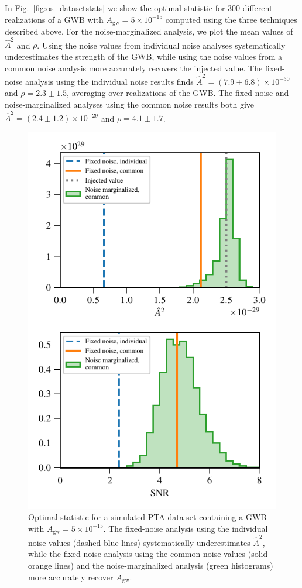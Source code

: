 \documentclass[twocolumn,aps,prd,superscriptaddress]{revtex4-1}
\newcommand{\Agw}{\ensuremath{A_\mathrm{gw}}}
\begin{document}
In Fig.~\ref{fig:os_datasetstats} we show the optimal statistic 
for 300 different realizations of a GWB with $\Agw = 5\times10^{-15}$ 
computed using the three techniques described above. 
For the noise-marginalized analysis, we plot 
the mean values of $\hat{A}^2$ and $\rho$. 
Using the noise values from individual noise analyses 
systematically underestimates the strength of the GWB, 
while using the noise values from a common noise analysis 
more accurately recovers the injected value. 
The fixed-noise analysis using the individual noise results finds 
$\hat{A}^2 = (7.9 \pm 6.8) \times10^{-30}$ and $\rho = 2.3 \pm 1.5$, 
averaging over realizations of the GWB. 
The fixed-noise and noise-marginalized analyses 
using the common noise results both give 
$\hat{A}^2 = (2.4\pm1.2)\times10^{-29}$ and $\rho = 4.1 \pm 1.7$.

\begin{figure}[tb]
	\includegraphics[width=0.9\columnwidth]{plots/optstat_A5e-15_dataset11.pdf}
	\caption{Optimal statistic 
			for a simulated PTA data set containing a GWB with $\Agw = 5\times10^{-15}$. 
			The fixed-noise analysis using the individual noise values (dashed blue lines) 
			systematically underestimates $\hat{A}^2$, while the 
			fixed-noise analysis using the common noise values (solid orange lines) 
			and the noise-marginalized analysis (green histograms) 
			more accurately recover $\Agw$.}
	\label{fig:os_dataset_sample}
\end{figure}
\end{document}
